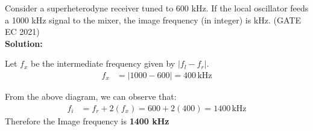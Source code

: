 \documentclass{article}
\begin{document}
Consider a superheterodyne receiver tuned to 600 kHz. If the local oscillator feeds a 1000 kHz signal to the mixer, the image frequency (in integer) is \underline{\hspace{1cm}} kHz.
\hfill(GATE EC 2021)\\

\textbf{Solution:}
\fi

Let \(f_x\) be the intermediate frequency given by \(|f_l - f_r|\).
\begin{align}
    f_x &= |1000-600| = 400 \, \text{kHz}
\end{align}


From the above diagram, we can observe that:
\begin{align}
    f_i &= f_r+2(f_x) = 600+2(400)=1400 \, \text{kHz}
\end{align}
Therefore the Image frequency is \textbf{1400 kHz}


\end{document}
